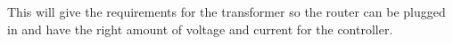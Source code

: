 This will give the requirements for the transformer so the router can be plugged in and have the right amount of voltage and current for the controller.